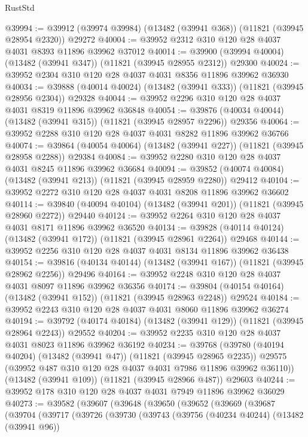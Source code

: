 \begin{lexlean}{RustStd}
\begin{coremodule}
@39994 := @39912 (@39974 @39984) (@13482 (@39941 @368)) (@11821 (@39945 @28954 @2320)) @29272
@40004 := @39952 @2312 @310 @120 @28 @4037 @4031 @8393 @11896 @39962 @37012
@40014 := @39900 (@39994 @40004) (@13482 (@39941 @347)) (@11821 (@39945 @28955 @2312)) @29300
@40024 := @39952 @2304 @310 @120 @28 @4037 @4031 @8356 @11896 @39962 @36930
@40034 := @39888 (@40014 @40024) (@13482 (@39941 @333)) (@11821 (@39945 @28956 @2304)) @29328
@40044 := @39952 @2296 @310 @120 @28 @4037 @4031 @8319 @11896 @39962 @36848
@40054 := @39876 (@40034 @40044) (@13482 (@39941 @315)) (@11821 (@39945 @28957 @2296)) @29356
@40064 := @39952 @2288 @310 @120 @28 @4037 @4031 @8282 @11896 @39962 @36766
@40074 := @39864 (@40054 @40064) (@13482 (@39941 @227)) (@11821 (@39945 @28958 @2288)) @29384
@40084 := @39952 @2280 @310 @120 @28 @4037 @4031 @8245 @11896 @39962 @36684
@40094 := @39852 (@40074 @40084) (@13482 (@39941 @213)) (@11821 (@39945 @28959 @2280)) @29412
@40104 := @39952 @2272 @310 @120 @28 @4037 @4031 @8208 @11896 @39962 @36602
@40114 := @39840 (@40094 @40104) (@13482 (@39941 @201)) (@11821 (@39945 @28960 @2272)) @29440
@40124 := @39952 @2264 @310 @120 @28 @4037 @4031 @8171 @11896 @39962 @36520
@40134 := @39828 (@40114 @40124) (@13482 (@39941 @172)) (@11821 (@39945 @28961 @2264)) @29468
@40144 := @39952 @2256 @310 @120 @28 @4037 @4031 @8134 @11896 @39962 @36438
@40154 := @39816 (@40134 @40144) (@13482 (@39941 @167)) (@11821 (@39945 @28962 @2256)) @29496
@40164 := @39952 @2248 @310 @120 @28 @4037 @4031 @8097 @11896 @39962 @36356
@40174 := @39804 (@40154 @40164) (@13482 (@39941 @152)) (@11821 (@39945 @28963 @2248)) @29524
@40184 := @39952 @2243 @310 @120 @28 @4037 @4031 @8060 @11896 @39962 @36274
@40194 := @39792 (@40174 @40184) (@13482 (@39941 @129)) (@11821 (@39945 @28964 @2243)) @29552
@40204 := @39952 @2235 @310 @120 @28 @4037 @4031 @8023 @11896 @39962 @36192
@40234 := @39768
    (@39780
      (@40194 @40204)
      (@13482 (@39941 @47))
      (@11821 (@39945 @28965 @2235))
      @29575
      (@39952 @487 @310 @120 @28 @4037 @4031 @7986 @11896 @39962 @36110))
    (@13482 (@39941 @109))
    (@11821 (@39945 @28966 @487))
    @29603
@40244 := @39952 @178 @310 @120 @28 @4037 @4031 @7949 @11896 @39962 @36029
@40273 := @39582
    (@39607
      (@39648
        (@39650
          (@39652
            (@39669
              (@39687
                (@39704
                  (@39717
                    (@39726
                      (@39730
                        (@39743
                          (@39756
                            (@40234 @40244)
                            (@13482 (@39941 @96))

\end{coremodule}
\end{lexlean}
